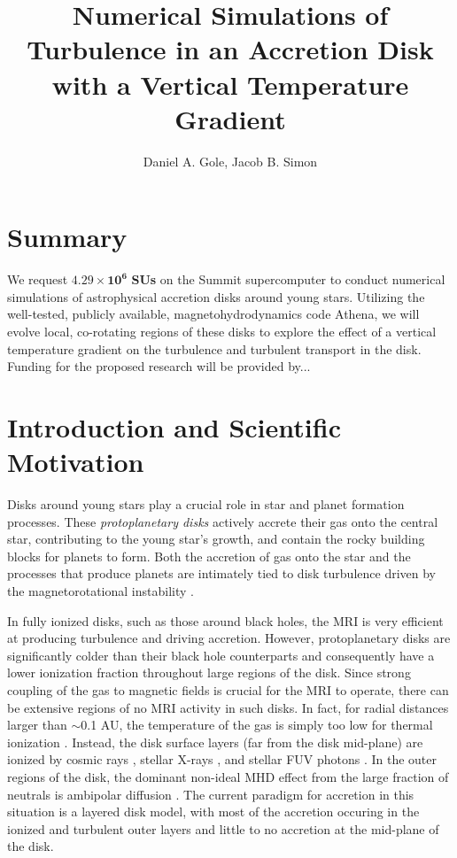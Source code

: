 \documentclass[preprint]{aastex}
\begin{document}
\title{\LARGE \bf Numerical Simulations of Turbulence in an Accretion Disk with a Vertical Temperature Gradient}
\author{\large Daniel A. Gole, Jacob B. Simon}
\maketitle
\vspace{-8mm}
\section{Summary}
We request $\mathbf{4.29\times10^6}$ {\bf SUs} on the {\sc Summit} supercomputer to conduct numerical simulations of astrophysical accretion disks around young stars.
Utilizing the well-tested, publicly available, magnetohydrodynamics code {\sc Athena}, we will evolve local, co-rotating regions of these disks to explore the effect of a vertical temperature gradient on the turbulence and turbulent transport in the disk.  Funding for the proposed research will be provided by... 

\vspace{-8mm}
\section{Introduction and Scientific Motivation}
\vspace{-2mm}
Disks around young stars play a crucial role in star and planet formation processes.  These {\it protoplanetary disks} actively accrete their gas onto the central star, contributing to the young star's growth, and contain the rocky building blocks for planets to form.  
Both the accretion of gas onto the star and the processes that produce planets are intimately tied to {disk turbulence} driven by the magnetorotational instability \cite[MRI;][]{balbus91,balbus98}.  

In fully ionized disks, such as those around black holes, the MRI is very efficient at producing turbulence and driving accretion.  However, protoplanetary disks are significantly colder than their black hole counterparts and consequently have a lower ionization fraction throughout large regions of the disk.  Since strong coupling of the gas to magnetic fields is crucial for the MRI to operate, there can be extensive regions of no MRI activity in such disks.  In fact, for radial distances larger than $\sim$0.1 AU, the temperature of the gas is simply too low for thermal ionization \citep{umebayashi83}.  Instead, the disk surface layers (far from the disk mid-plane) are ionized by cosmic rays \citep{gammie96}, stellar X-rays \citep{igea99}, and stellar FUV photons \citep{perez-becker11b}.  In the outer regions of the disk, the dominant non-ideal MHD effect from the large fraction of neutrals is ambipolar diffusion \citep{armitage11,turner14}.  The current paradigm for accretion in this situation is a layered disk model, with most of the accretion occuring in the ionized and turbulent outer layers and little to no accretion at the mid-plane of the disk.
\end{document}
